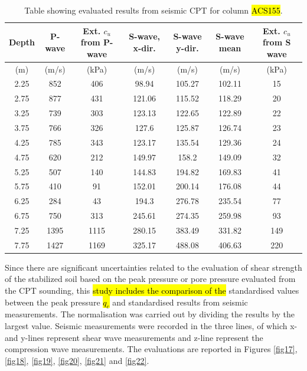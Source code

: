 \documentclass[final,3p,times,onecolumn,authoryear]{elsarticle}
\begin{document}
\begin{table}[t]
  \caption{Table showing evaluated results from seismic CPT for column \hl{ACS155}.}
  \centering
  \begin{tabular}{| c c c c c c c |}                         
    Depth & P-wave & Ext. $c_u$ from P-wave & S-wave, x-dir. & S-wave y-dir. & S-wave mean & Ext. $c_u$ from S wave \\ \hline 
    (m) & (m/s) & (kPa) & (m/s) & (m/s) & (m/s) & (kPa) \\ \hline
    2.25 & 852 & 406 & 98.94 & 105.27 & 102.11 & 15 \\
    2.75 & 877 & 431 & 121.06 & 115.52 & 118.29 & 20 \\
    3.25 & 739 & 303 & 123.13 & 122.65 & 122.89 & 22 \\
    3.75 & 766 & 326 & 127.6 & 125.87 & 126.74 & 23 \\
    4.25 & 785 & 343 & 123.17 & 135.54 & 129.36 & 24 \\
    4.75 & 620 & 212 & 149.97 & 158.2 & 149.09 & 32 \\
    5.25 & 507 & 140 & 144.83 & 194.82 & 169.83 & 41 \\
    5.75 & 410 & 91 & 152.01 & 200.14 & 176.08 & 44 \\
    6.25 & 284 & 43 & 194.3 & 276.78 & 235.54 & 77 \\
    6.75 & 750 & 313 & 245.61 & 274.35 & 259.98 & 93 \\
    7.25 & 1395 & 1115 & 280.15 & 383.49 & 331.82 & 149 \\
    7.75 & 1427 & 1169 & 325.17 & 488.08 & 406.63 & 220
  \end{tabular}
  \label{tab:2}
\end{table}

Since there are significant uncertainties related to the evaluation of shear strength of the stabilized soil based on the peak pressure or pore pressure evaluated from the CPT sounding, this \hl{study includes the comparison of the } standardised values between the peak pressure \hl{$q_c$} and standardised results from seismic measurements. The normalisation was carried out by dividing the results by the largest value. Seismic measurements were recorded in the three lines, of which x- and y-lines represent shear wave measurements and z-line represent the compression wave measurements. The evaluations are reported in Figures \ref{fig17}, \ref{fig18}, \ref{fig19}, \ref{fig20}, \ref{fig21} and \ref{fig22}.  
\end{document}
